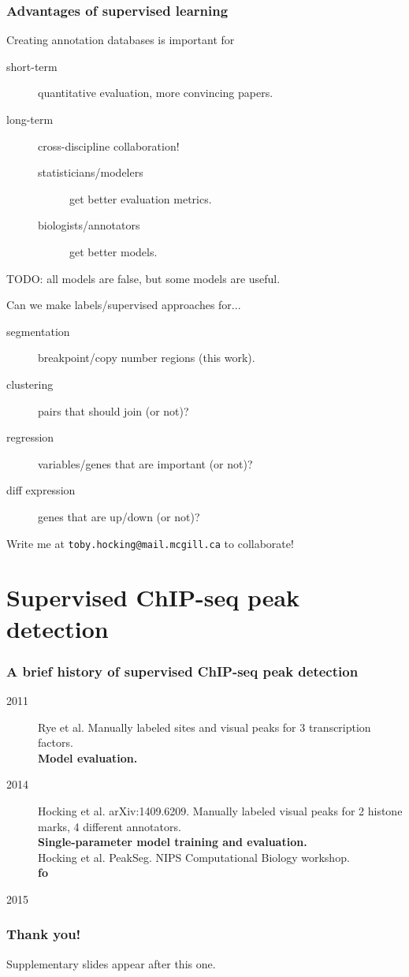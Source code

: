 \documentclass{beamer}
\begin{document}
\begin{frame} 
  \frametitle{Advantages of supervised learning}
  Creating annotation databases is important for
  \begin{description}
  \item[short-term] quantitative evaluation, more convincing papers.
  \item[long-term] cross-discipline collaboration!
    \begin{description}
    \item[statisticians/modelers] get better evaluation
    metrics.
    \item[biologists/annotators] get
    better models.
    \end{description}
  \end{description}
  TODO: all models are false, but some models are useful.

  Can we make labels/supervised approaches for...
  \begin{description}
  \item[segmentation] breakpoint/copy number regions (this work).
  \item[clustering] pairs that should join (or not)?
  \item[regression] variables/genes that are important (or not)?
  \item[diff expression] genes that are up/down (or not)?
  \end{description}
  Write me at \texttt{toby.hocking@mail.mcgill.ca} to collaborate!
\end{frame}

\section{Supervised ChIP-seq peak detection}

\begin{frame}
  \frametitle{A brief history of supervised ChIP-seq peak detection}
  \begin{description}
  \item[2011] Rye et al. Manually labeled sites and visual peaks for 3
    transcription factors.\\
    \textbf{Model evaluation.}
  \item[2014] Hocking et al. arXiv:1409.6209. Manually labeled visual
    peaks for 2 histone marks, 4 different annotators.
    \\
    \textbf{Single-parameter model training and evaluation.}\\
    Hocking et al. PeakSeg. NIPS Computational Biology workshop.\\
    \textbf{fo}
  \item[2015] 
  \end{description}
\end{frame}

\begin{frame}
  \frametitle{Thank you!}
  Supplementary slides appear after this one.
\end{frame}
\end{document}

